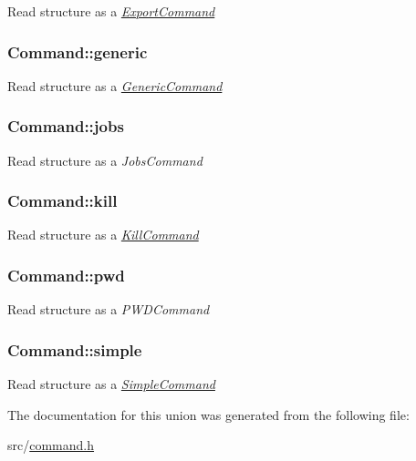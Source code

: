 Read structure as a {\itshape \hyperlink{structExportCommand}{Export\-Command}} \hypertarget{unionCommand_a22a7dad0e3935c261a1643c8c5ea46aa}{
\subsubsection[{generic}]{ Command\-::generic}}\label{unionCommand_a22a7dad0e3935c261a1643c8c5ea46aa}
Read structure as a {\itshape \hyperlink{structGenericCommand}{Generic\-Command}} \hypertarget{unionCommand_abeb4905f11baf90a800fe211dd5ecdc9}{
\subsubsection[{jobs}]{ Command\-::jobs}}\label{unionCommand_abeb4905f11baf90a800fe211dd5ecdc9}
Read structure as a {\itshape Jobs\-Command} \hypertarget{unionCommand_a19c5261961f2f9a7fcbf9f5379d3f98a}{
\subsubsection[{kill}]{ Command\-::kill}}\label{unionCommand_a19c5261961f2f9a7fcbf9f5379d3f98a}
Read structure as a {\itshape \hyperlink{structKillCommand}{Kill\-Command}} \hypertarget{unionCommand_a34fc21bb2a7fee2df4d3674b9d8166ff}{
\subsubsection[{pwd}]{ Command\-::pwd}}\label{unionCommand_a34fc21bb2a7fee2df4d3674b9d8166ff}
Read structure as a {\itshape P\-W\-D\-Command} \hypertarget{unionCommand_a269da4d9b16689de14a0ec83636b59e8}{
\subsubsection[{simple}]{ Command\-::simple}}\label{unionCommand_a269da4d9b16689de14a0ec83636b59e8}
Read structure as a {\itshape \hyperlink{structSimpleCommand}{Simple\-Command}} 

The documentation for this union was generated from the following file\-:\begin{DoxyCompactItemize}
\item 
src/\hyperlink{command_8h}{command.\-h}\end{DoxyCompactItemize}
